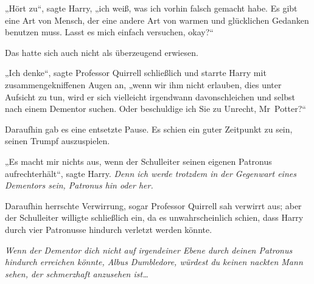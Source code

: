 „Hört zu“, sagte Harry, „ich weiß, was ich vorhin falsch gemacht habe. Es gibt eine Art von Mensch, der eine andere Art von warmen und glücklichen Gedanken benutzen muss. Lasst es mich einfach versuchen, okay?“

Das hatte sich auch nicht als überzeugend erwiesen.

„Ich denke“, sagte Professor Quirrell schließlich und starrte Harry mit zusammengekniffenen Augen an, „wenn wir ihm nicht erlauben, dies unter Aufsicht zu tun, wird er sich vielleicht irgendwann davonschleichen und selbst nach einem Dementor suchen. Oder beschuldige ich Sie zu Unrecht, Mr~Potter?“

Daraufhin gab es eine entsetzte Pause. Es schien ein guter Zeitpunkt zu sein, seinen Trumpf auszuspielen.

„Es macht mir nichts aus, wenn der Schulleiter seinen eigenen Patronus aufrechterhält“, sagte Harry. \emph{Denn ich werde trotzdem in der Gegenwart eines Dementors sein, Patronus hin oder her.}

Daraufhin herrschte Verwirrung, sogar Professor Quirrell sah verwirrt aus; aber der Schulleiter willigte schließlich ein, da es unwahrscheinlich schien, dass Harry durch vier Patronusse hindurch verletzt werden könnte.

\emph{Wenn der Dementor dich nicht auf irgendeiner Ebene durch deinen Patronus hindurch erreichen könnte, Albus Dumbledore, würdest du keinen nackten Mann sehen, der schmerzhaft anzusehen ist…}

